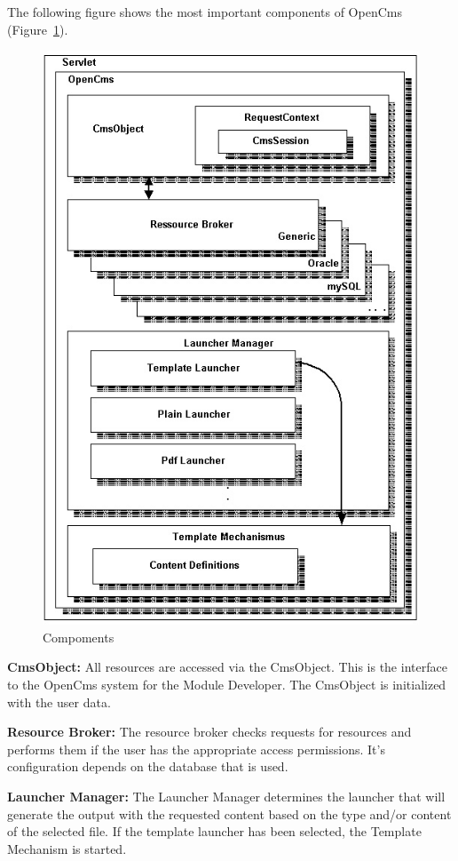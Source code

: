 The following figure shows the most important components of OpenCms 
(Figure~\ref {Components}).\\

\begin{figure}
\begin{center}
\includegraphics[clip,width=0.7 \linewidth]{pics/modules/2}
\end{center}
\caption[Components]{Compoments}
\label{Components}
\end{figure}


{\bf CmsObject:}
All resources are accessed via the  CmsObject. This is the interface to
the OpenCms system for the Module Developer. The CmsObject is
initialized with the user data.

{\bf Resource Broker:}
The  resource broker checks requests for resources and performs them if
the user has the appropriate access permissions. It's configuration
depends on the database that is used.

{\bf Launcher Manager:}
The  Launcher Manager determines the launcher that will generate the
output with the requested content based on the type and/or content of
the selected file. If the template launcher has been selected, the
Template Mechanism is started.

